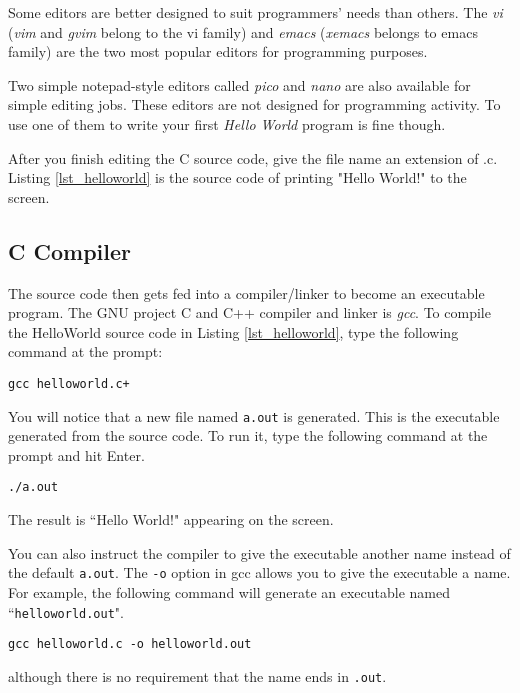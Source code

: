 Some editors are better designed to suit programmers' needs than others. The {\em vi} ({\em vim} and {\em gvim} belong to the vi family) and {\em emacs} ({\em xemacs} belongs to emacs family) are the two most popular editors for programming purposes.


Two simple notepad-style editors called {\em pico} and {\em nano} are also available for simple editing jobs. These editors are not designed for programming activity. To use one of them to write your first {\em Hello World} program is fine though. 

After you finish editing the C source code, give the file name an extension of .c. Listing \ref{lst_helloworld} is the source code of printing "Hello World!" to the screen. 



\subsection{C Compiler}
The source code then gets fed into a compiler/linker to become an executable program.
The GNU project C and C++ compiler and linker is {\em gcc}. To compile the HelloWorld source code in Listing \ref{lst_helloworld}, type the following command at the prompt:
\begin{lstlisting}[style=bash]
gcc helloworld.c+ 
\end{lstlisting}
You will notice that a new file named \verb+a.out+ is generated.
This is the executable generated from the source code. To run it, type the following command at the prompt and hit Enter.
\begin{lstlisting}[style=bash]
./a.out
\end{lstlisting}
The result is ``Hello World!" appearing on the screen.

You can also instruct the compiler to give the executable another name instead of the default \verb+a.out+. The \verb+-o+ option in gcc allows you to give the executable a name. For example, the following command will generate an executable named ``\verb+helloworld.out+".
\begin{lstlisting}[style=bash]
gcc helloworld.c -o helloworld.out
\end{lstlisting}
although there is no requirement that the name ends in \verb+.out+.
